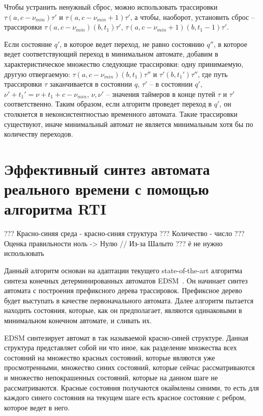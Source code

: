 \documentclass[times,specification,annotation]{itmo-student-thesis}
\begin{document}
Чтобы устранить ненужный сброс, можно использовать трассировки $\tau(a, c - \nu_{min})\tau'$ и $\tau(a, c - \nu_{min} + 1)\tau'$, а чтобы, наоборот, установить сброс -- трассировки
$\tau(a, c - \nu_{min})(b, t_1)\tau'$, $\tau(a, c - \nu_{min} + 1)(b, t_1 - 1)\tau'$.

Если состояние $q'$, в которое ведет переход, не равно состоянию $q''$, в которое ведет соответствующий переход в минимальном автомате, добавим в характеристическое множество следующие трассировки: одну
принимаемую, другую отвергаемую:
$\tau(a, c - \nu_{min})(b, t_1)\tau''$ и $\tau'(b, t_1')\tau''$, где путь трассировки $\tau$ заканчивается в состоянии $q$, $\tau'$ -- в состоянии $q'$, $\nu' + t_1' = \nu + t_1 + c - \nu_{min}$,
$\nu, \nu'$ -- значения таймеров в конце путей $\tau$ и $\tau'$ соответственно. Таким образом, если алгоритм проведет переход в $q'$, он столкнется в неконсистентностью временного автомата.
Такие трассировки существуют, иначе минимальный автомат не является минимальным хотя бы по количеству переходов.

\section{Эффективный синтез автомата реального времени с помощью алгоритма RTI}

??? Красно-синяя среда - красно-синяя структура
??? Количество - число
??? Оценка правильности ноль -> Нулю // Из-за Шалыто
??? ё не нужно использовать

Данный алгоритм основан на адаптации текущего state-of-the-art алгоритма синтеза конечных детерминированных автоматов EDSM~\cite{state-merging-dfa}. 
Он начинает синтез автомата с построения префиксного дерева трассировок. Префиксное дерево будет выступать в качестве первоначального автомата.
Далее алгоритм пытается находить состояния, которые, как он предполагает, являются одинаковыми в минимальном конечном автомате, и сливать их.

EDSM синтезирует автомат в так называемой красно-синей структуре. Данная структура представляет собой ни что иное, как разделение множества всех состояний на
множество красных состояний, которые являются уже просмотренными, множество синих состояний, которые сейчас рассматриваются и множество непокрашенных
состояний, которые на данном шаге не рассматриваются. Красные состояния получаются окаймлены синими, то есть
для каждого синего состояния на текущем шаге есть красное состояние с ребром, которое ведет в него.
\end{document}
